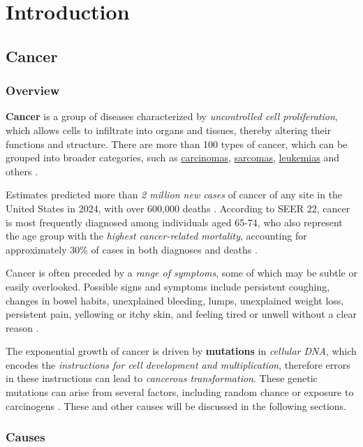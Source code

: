 \chapter{Introduction} \label{chap:introduction}

\section{Cancer}

\subsection{Overview}

\textbf{Cancer} is a group of diseases characterized by \textit{uncontrolled cell proliferation}, which allows cells to infiltrate into organs and tissues, thereby altering their functions and structure. There are more than 100 types of cancer, which can be grouped into broader categories, such as \href{https://en.wikipedia.org/wiki/Carcinoma}{carcinomas}, \href{https://en.wikipedia.org/wiki/Sarcoma}{sarcomas}, \href{https://en.wikipedia.org/wiki/Leukemia}{leukemias} and others \cite{cancer1}.

Estimates predicted more than \textit{2 million new cases} of cancer of any site in the United States in 2024, with over 600,000 deaths \cite{cancer4}. According to SEER \cite{seer} 22, cancer is most frequently diagnosed among individuals aged 65-74, who also represent the age group with the \textit{highest cancer-related mortality}, accounting for approximately 30\% of cases in both diagnoses and deaths \cite{cancer5}.

Cancer is often preceded by a \textit{range of symptoms}, some of which may be subtle or easily overlooked. Possible signs and symptoms include persistent coughing, changes in bowel habits, unexplained bleeding, lumps, unexplained weight loss, persistent pain, yellowing or itchy skin, and feeling tired or unwell without a clear reason \cite{cancer3}.

The exponential growth of cancer is driven by \textbf{mutations} in \textit{cellular DNA}, which encodes the \textit{instructions for cell development and multiplication}, therefore errors in these instructions can lead to \textit{cancerous transformation}. These genetic mutations can arise from several factors, including random chance or exposure to carcinogens \cite{cancer2}. These and other causes will be discussed in the following sections.

\subsection{Causes}

